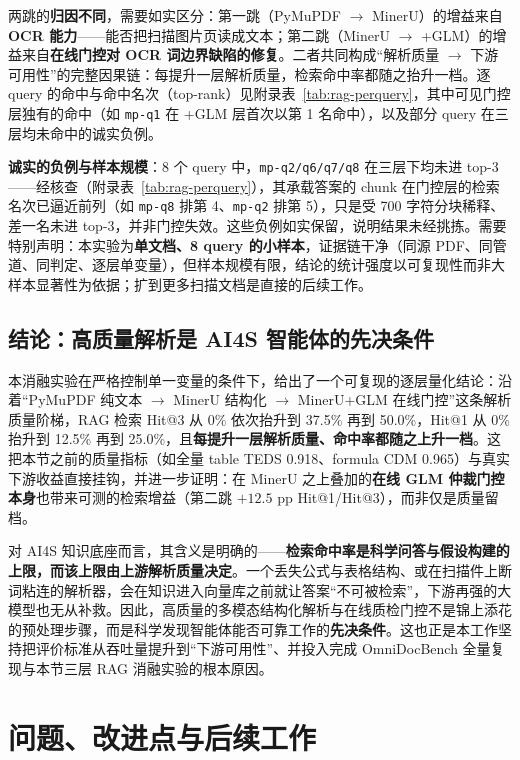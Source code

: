 \documentclass[UTF8,a4paper,11pt]{ctexart}
\begin{document}
两跳的\textbf{归因不同}，需要如实区分：第一跳（PyMuPDF $\to$ MinerU）的增益来自\textbf{OCR 能力}——能否把扫描图片页读成文本；第二跳（MinerU $\to$ +GLM）的增益来自\textbf{在线门控对 OCR 词边界缺陷的修复}。二者共同构成``解析质量 $\to$ 下游可用性''的完整因果链：每提升一层解析质量，检索命中率都随之抬升一档。逐 query 的命中与命中名次（top-rank）见附录表~\ref{tab:rag-perquery}，其中可见门控层独有的命中（如 \texttt{mp-q1} 在 +GLM 层首次以第 1 名命中），以及部分 query 在三层均未命中的诚实负例。

\textbf{诚实的负例与样本规模}：8 个 query 中，\texttt{mp-q2/q6/q7/q8} 在三层下均未进 top-3——经核查（附录表~\ref{tab:rag-perquery}），其承载答案的 chunk 在门控层的检索名次已逼近前列（如 \texttt{mp-q8} 排第 4、\texttt{mp-q2} 排第 5），只是受 700 字符分块稀释、差一名未进 top-3，并非门控失效。这些负例如实保留，说明结果未经挑拣。需要特别声明：本实验为\textbf{单文档、8 query 的小样本}，证据链干净（同源 PDF、同管道、同判定、逐层单变量），但样本规模有限，结论的统计强度以可复现性而非大样本显著性为依据；扩到更多扫描文档是直接的后续工作。

\subsection{结论：高质量解析是 AI4S 智能体的先决条件}

本消融实验在严格控制单一变量的条件下，给出了一个可复现的逐层量化结论：沿着``PyMuPDF 纯文本 $\to$ MinerU 结构化 $\to$ MinerU+GLM 在线门控''这条解析质量阶梯，RAG 检索 Hit@3 从 0\% 依次抬升到 37.5\% 再到 50.0\%，Hit@1 从 0\% 抬升到 12.5\% 再到 25.0\%，且\textbf{每提升一层解析质量、命中率都随之上升一档}。这把本节之前的质量指标（如全量 table TEDS 0.918、formula CDM 0.965）与真实下游收益直接挂钩，并进一步证明：在 MinerU 之上叠加的\textbf{在线 GLM 仲裁门控本身}也带来可测的检索增益（第二跳 $+12.5$ pp Hit@1/Hit@3），而非仅是质量留档。

对 AI4S 知识底座而言，其含义是明确的——\textbf{检索命中率是科学问答与假设构建的上限，而该上限由上游解析质量决定}。一个丢失公式与表格结构、或在扫描件上断词粘连的解析器，会在知识进入向量库之前就让答案``不可被检索''，下游再强的大模型也无从补救。因此，高质量的多模态结构化解析与在线质检门控不是锦上添花的预处理步骤，而是科学发现智能体能否可靠工作的\textbf{先决条件}。这也正是本工作坚持把评价标准从吞吐量提升到``下游可用性''、并投入完成 OmniDocBench 全量复现与本节三层 RAG 消融实验的根本原因。

\section{问题、改进点与后续工作}
\end{document}
